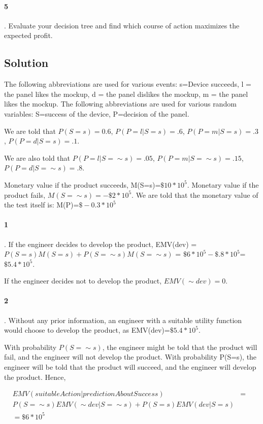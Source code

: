 \documentclass[10pt]{article}
\begin{document}
   \paragraph{5}. Evaluate your decision tree and find which course of action maximizes the expected profit.

\subsection{Solution}

The following abbreviations are used for various events: s=Device succeeds, l = the panel likes the mockup, d = the panel dislikes the mockup, m = the panel likes the mockup. The following abbreviations are used for various random variables: S=success of the device, P=decision of the panel.

We are told that $P(S=s)=0.6$, $P(P=l|S=s)=.6$, $P(P=m|S=s)=.3$, $P(P=d|S=s)=.1$.

We are also told that $P(P=l|S=\sim s)=.05$, $P(P=m|S=\sim s)=.15$, $P(P=d|S=\sim s)=.8$.

Monetary value if the product succeeds, M(S=s)=$\$10*10^{5}$. Monetary value if the product fails, $M(S=\sim s)=-\$2*10^{5}$. We are told that the monetary value of the test itself is: M(P)=$\$-0.3*10^{5}$

   \paragraph{1}. If the engineer decides to develop the product, EMV(dev) = $P(S=s)M(S=s) + P(S=\sim s)M(S=\sim s)$ = $\$6*10^{5}-\$.8*10^{5}$=$\$5.4*10^{5}$.

If the engineer decides not to develop the product, $EMV(\sim dev) = 0$.

   \paragraph{2}. Without any prior information, an engineer with a suitable utility function would choose to develop the product, as EMV(dev)=$\$5.4*10^{5}$.

With probability $P(S=\sim s)$, the engineer might be told that the product will fail, and the engineer will not develop the product. With probability P(S=s), the engineer will be told that the product will succeed, and the engineer will develop the product. Hence, 

\begin{eqnarray}
EMV(suitableAction|predictionAboutSuccess) & = & \\
P(S=\sim s)EMV(\sim dev|S=\sim s)+P(S=s)EMV(dev|S=s) & & \\
=\$6*10^{5} & & \\
\end{eqnarray}
\end{document}
